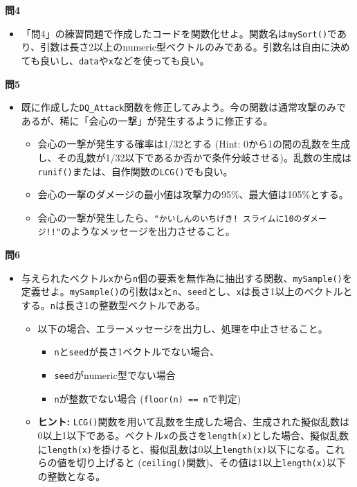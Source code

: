\documentclass[
  a4paper,
  pandoc,
  ja=standard,
  jafont=haranoaji]{bxjsbook}
\providecommand{\tightlist}{%
  \setlength{\itemsep}{0pt}\setlength{\parskip}{0pt}}
\begin{document}
\textbf{問4}

\begin{itemize}
\tightlist
\item
  「問4」の練習問題で作成したコードを関数化せよ。関数名は\texttt{mySort()}であり、引数は長さ2以上のnumeric型ベクトルのみである。引数名は自由に決めても良いし、\texttt{data}や\texttt{x}などを使っても良い。
\end{itemize}

\textbf{問5}

\begin{itemize}
\tightlist
\item
  既に作成した\texttt{DQ\_Attack}関数を修正してみよう。今の関数は通常攻撃のみであるが、稀に「会心の一撃」が発生するように修正する。

  \begin{itemize}
  \tightlist
  \item
    会心の一撃が発生する確率は1/32とする (Hint:
    0から1の間の乱数を生成し、その乱数が1/32以下であるか否かで条件分岐させる)。乱数の生成は\texttt{runif()}または、自作関数の\texttt{LCG()}でも良い。
  \item
    会心の一撃のダメージの最小値は攻撃力の95\%、最大値は105\%とする。
  \item
    会心の一撃が発生したら、\texttt{"かいしんのいちげき!\ スライムに10のダメージ!!"}のようなメッセージを出力させること。
  \end{itemize}
\end{itemize}

\textbf{問6}

\begin{itemize}
\tightlist
\item
  与えられたベクトル\texttt{x}から\texttt{n}個の要素を無作為に抽出する関数、\texttt{mySample()}を定義せよ。\texttt{mySample()}の引数は\texttt{x}と\texttt{n}、\texttt{seed}とし、\texttt{x}は長さ1以上のベクトルとする。\texttt{n}は長さ1の整数型ベクトルである。

  \begin{itemize}
  \tightlist
  \item
    以下の場合、エラーメッセージを出力し、処理を中止させること。

    \begin{itemize}
    \tightlist
    \item
      \texttt{n}と\texttt{seed}が長さ1ベクトルでない場合、
    \item
      \texttt{seed}がnumeric型でない場合
    \item
      \texttt{n}が整数でない場合 (\texttt{floor(n)\ ==\ n}で判定)
    \end{itemize}
  \item
    \textbf{ヒント:}
    \texttt{LCG()}関数を用いて乱数を生成した場合、生成された擬似乱数は0以上1以下である。ベクトル\texttt{x}の長さを\texttt{length(x)}とした場合、擬似乱数に\texttt{length(x)}を掛けると、擬似乱数は0以上\texttt{length(x)}以下になる。これらの値を切り上げると
    (\texttt{ceiling()}関数)、その値は1以上\texttt{length(x)}以下の整数となる。
  \end{itemize}
\end{itemize}
\end{document}
